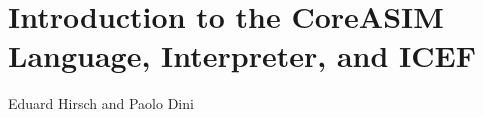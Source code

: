 \chapter{Introduction to the CoreASIM Language, Interpreter, and ICEF}
\label{ch:coreasimintro}

\vspace{-1cm}
\begin{center}
Eduard Hirsch and Paolo Dini
\end{center}

